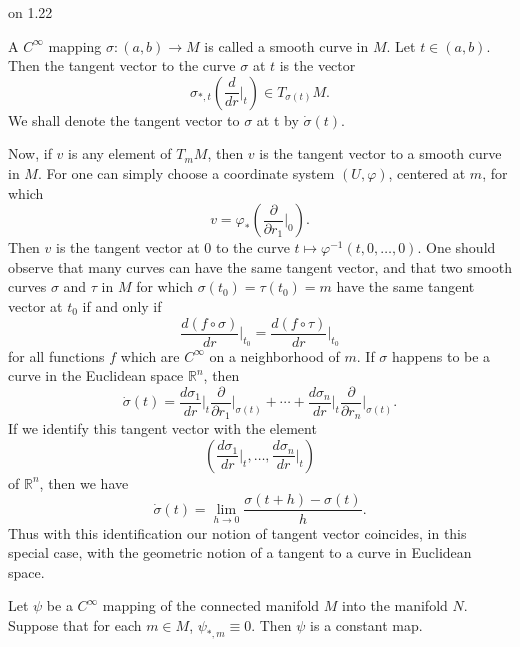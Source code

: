 \begin{remarks}{on 1.22}
\begin{enumerate}
		 A $C^{\infty}$ mapping $\sigma: (a,b)\to M$ is called a smooth curve in $M$. Let $t\in(a,b)$. Then
		the tangent vector to the curve $\sigma$ at $t$ is the vector 
		\[
			\sigma_{*,t}\left(\frac{d}{d r}\bigg|_{t}\right)\in T_{\sigma(t)} M.
		\]
		We shall denote the tangent vector to  $ \sigma $ at t by  $ \dot{\sigma}(t) $.
		\begin{center}
		\end{center}
		Now, if $v$ is any element of $T_{m} M$, then $v$ is the tangent vector to a smooth
		curve in $M$. For one can simply choose a coordinate system $(U,\varphi)$,
		centered at $m$, for which
		\[
			v=\varphi_{*}\left(\frac{\partial}{\partial r_{1}}\bigg|_{0}\right).
		\]
		Then $v$ is the tangent vector at 0 to the curve $t \mapsto \varphi^{-1}(t, 0, \ldots, 0)$. One
		should observe that many curves can have the same tangent vector, and
		that two smooth curves $\sigma$ and $\tau$ in $M$ for which $\sigma(t_{0}) = \tau(t_{0}) = m$
		have the same tangent vector at $t_{0}$ if and only if
		\[
			\frac{d(f\circ\sigma)}{d r}\Big|_{t_{0}}=\frac{d(f\circ\tau)}{d r}\Big|_{t_{0}}
		\]
		for all functions $f$ which are $C^{\infty}$ on a neighborhood of $m$.
		If $\sigma$ happens to be a curve in the Euclidean space $\mathbb{R}^{n}$, then
		\[
			\dot{\sigma}(t)=\frac{d\sigma_{1}}{d r}\bigg|_{t}\frac{\partial}{\partial r_{1}}\bigg|_{\sigma(t)}+\cdots+\frac{d\sigma_{n}}{d r}\bigg|_{t}\frac{\partial}{\partial r_{n}}\bigg|_{\sigma(t)}.
		\]
		If we identify this tangent vector with the element
		\[
			\left(\frac{d\sigma_{1}}{d r}\bigg|_{t},\ldots,\frac{d\sigma_{n}}{d r}\bigg|_{t}\right)
		\]
		of $\mathbb{R}^{n}$, then we have
		\[
			\dot{\sigma}(t)=\lim_{h\to0}\frac{\sigma(t+h)-\sigma(t)}{h}.
		\]
		Thus with this identification our notion of tangent vector coincides,
		in this special case, with the geometric notion of a tangent to a curve in Euclidean space.
	\end{enumerate}

\end{remarks}

\begin{theorem}\label{thm:1.24}
	Let $\psi$ be a $C^\infty$ mapping of the connected manifold $M$ into the manifold $N$. Suppose that for
	each $m \in M$, $\psi_{*,m} \equiv 0$. Then $\psi$ is a constant map.
\end{theorem}

